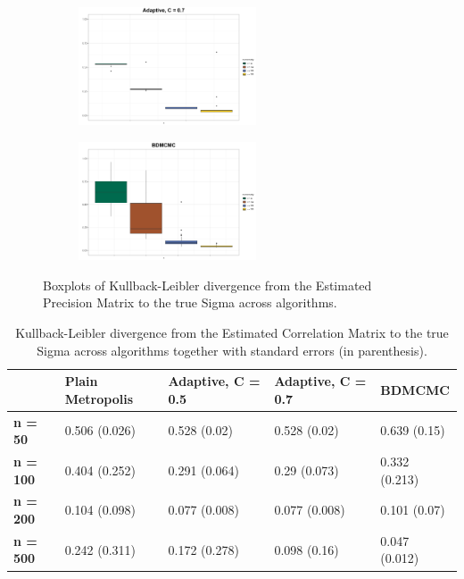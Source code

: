 \documentclass{report}
\begin{document}
\begin{figure}[!ht]
{\begin{minipage}{\textwidth}
			\begin{subfigure}[b]{0.45\textwidth}   
				\centering
				\includegraphics[height=3.5cm]{Figures/Overall_comparison/Boxplot_KL_c07.png}
				\label{fig:kl-200}
			\end{subfigure}
			\hspace{0.35cm}  %
			\begin{subfigure}[b]{0.45\textwidth}   
				\centering
				\includegraphics[height=3.5cm]{Figures/Overall_comparison/Boxplot_KL_bdmcmc.png}
				\label{fig:kl-500}
			\end{subfigure}
		\end{minipage}
	}
	\caption{Boxplots of Kullback-Leibler divergence from the Estimated Precision Matrix to the true Sigma across algorithms.}
	\label{fig:kl-overall}
\end{figure}

\begin{table}[!ht]
	\centering
	\begin{tabular}{|l|l|l|l|l|}
		\hline
		\textbf{} & Plain Metropolis & Adaptive, C = 0.5 & Adaptive, C = 0.7 & BDMCMC \\ \hline
		\textbf{n = 50} & 0.506 (0.026) & 0.528 (0.02) & 0.528 (0.02) & 0.639 (0.15) \\ \hline
		\textbf{n = 100} & 0.404 (0.252) & 0.291 (0.064) & 0.29 (0.073) & 0.332 (0.213) \\ \hline
		\textbf{n = 200} & 0.104 (0.098) & 0.077 (0.008) & 0.077 (0.008) & 0.101 (0.07) \\ \hline
		\textbf{n = 500} & 0.242 (0.311) & 0.172 (0.278) & 0.098 (0.16) & 0.047 (0.012) \\ \hline
	\end{tabular}
	\caption{Kullback-Leibler divergence from the Estimated Correlation Matrix to the true Sigma across algorithms together with standard errors (in parenthesis).}
	\label{table:Kullback-leibler}
\end{table}
\end{document}

